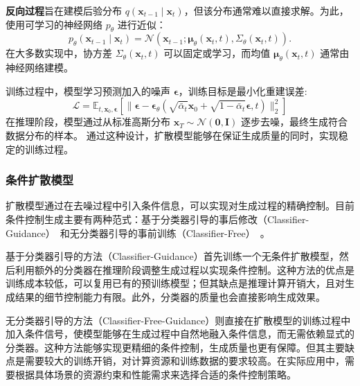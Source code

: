 \textbf{反向过程}旨在建模后验分布 $q(\mathbf{x}_{t-1} \mid \mathbf{x}_t)$，但该分布通常难以直接求解。为此，使用可学习的神经网络 $p_{\theta}$ 进行近似：
\begin{equation}
    p_{\theta}(\mathbf{x}_{t-1} \mid \mathbf{x}_t) = \mathcal{N}(\mathbf{x}_{t-1}; \boldsymbol{\mu}_{\theta}(\mathbf{x}_t, t), \Sigma_{\theta}(\mathbf{x}_t, t)).
\end{equation}
在大多数实现中，协方差 $\Sigma_{\theta}(\mathbf{x}_t, t)$ 可以固定或学习，而均值 $\boldsymbol{\mu}_{\theta}(\mathbf{x}_t, t)$ 通常由神经网络建模。

训练过程中，模型学习预测加入的噪声 $\boldsymbol{\epsilon}$，训练目标是最小化重建误差:
\begin{equation}
    \mathcal{L} = \mathbb{E}_{t,\mathbf{x}_0,\boldsymbol{\epsilon}}[\|\boldsymbol{\epsilon} - \boldsymbol{\epsilon}_\theta(\sqrt{\bar{\alpha}_t}\mathbf{x}_0 + \sqrt{1-\bar{\alpha}_t}\boldsymbol{\epsilon},t)\|_2^2]
\end{equation}
在推理阶段，模型通过从标准高斯分布 $\mathbf{x}_T \sim \mathcal{N}(\mathbf{0}, \mathbf{I})$ 逐步去噪，最终生成符合数据分布的样本。
通过这种设计，扩散模型能够在保证生成质量的同时，实现稳定的训练过程。


\subsubsection{条件扩散模型}
扩散模型通过在去噪过程中引入条件信息，可以实现对生成过程的精确控制。目前条件控制生成主要有两种范式：基于分类器引导的事后修改（Classifier-Guidance）~\cite{dhariwal2021diffusion}和无分类器引导的事前训练（Classifier-Free）~\cite{ho2022classifier}。

基于分类器引导的方法（Classifier-Guidance）首先训练一个无条件扩散模型，然后利用额外的分类器在推理阶段调整生成过程以实现条件控制。这种方法的优点是训练成本较低，可以复用已有的预训练模型；但其缺点是推理计算开销大，且对生成结果的细节控制能力有限。此外，分类器的质量也会直接影响生成效果。

无分类器引导的方法（Classifier-Free-Guidance）则直接在扩散模型的训练过程中加入条件信号，使模型能够在生成过程中自然地融入条件信息，而无需依赖显式的分类器。这种方法能够实现更精细的条件控制，生成质量也更有保障。但其主要缺点是需要较大的训练开销，对计算资源和训练数据的要求较高。在实际应用中，需要根据具体场景的资源约束和性能需求来选择合适的条件控制策略。

